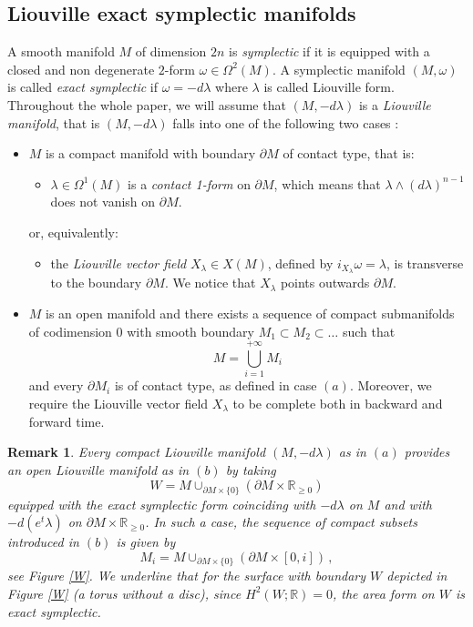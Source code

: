 \documentclass{article}
\newcommand{\1}{\mathbbm{1}}
\newcommand{\numberset}{\mathbb}
\newcommand{\R}{\numberset{R}}
\newtheorem{rem}[thm]{Remark}
\theoremstyle{remark}
\begin{document}
\subsection{Liouville exact symplectic manifolds}
A smooth manifold $M$ of dimension $2n$ is \textit{symplectic} if it is equipped with a closed and non degenerate $2$-form $\omega \in \Omega^2(M)$. A symplectic manifold $(M,\omega)$ is called \textit{exact symplectic} if $\omega = -d\lambda$ where $\lambda$ is called Liouville form. \\
Throughout the whole paper, we will assume that $(M,-d\lambda)$ is a \textit{Liouville manifold}, that is $(M,-d\lambda)$ falls into one of the following two cases : 

\begin{itemize}
\item[$(a)$] $M$ is a compact manifold with boundary $\partial M$ of contact type, that is:
\begin{itemize}
\item[$(a_1)$] $\lambda \in \Omega^1(M)$ is a \textit{contact 1-form} on $\partial M$, which means that $\lambda \wedge (d\lambda)^{n-1}$ does not vanish on $\partial M$.
\end{itemize}
or, equivalently:
\begin{itemize}
\item[$(a_2)$] the \textit{Liouville vector field} $X_\lambda \in X(M)$, defined by $i_{X_\lambda}\omega = \lambda$, is transverse to the boundary $\partial M$. We notice that $X_{\lambda}$ points outwards $\partial M$.
\end{itemize}
\item[$(b)$] $M$ is an open manifold and there exists a sequence of compact submanifolds of codimension 0 with smooth boundary $M_1 \subset M_2 \subset \ldots$ such that
$$M = \bigcup_{i = 1}^{+\infty} M_i$$ 
and every $\partial M_i$ is of contact type, as defined in case $(a)$. Moreover, we require the Liouville vector field $X_\lambda$ to be complete both in backward and forward time. 
\end{itemize}
\begin{rem}
\textnormal{Every compact Liouville manifold $(M,-d\lambda)$ as in $(a)$ provides an open Liouville manifold as in $(b)$ by taking
$$W = M \cup_{\partial M \times \{0\}} (\partial M \times \mathbb{R}_{\geq 0})$$
equipped with the exact symplectic form coinciding with $-d\lambda$ on $M$ and with $-d(e^t\lambda)$ on $\partial M \times \mathbb{R}_{\geq 0}$. In such a case, the sequence of compact subsets introduced in $(b)$ is given by
$$M_i = M \cup_{\partial M \times \{0\}}  (\partial M \times [0,i])\, ,$$
see Figure \ref{W}. We underline that for the surface with boundary $W$ depicted in Figure \ref{W} (a torus without a disc), since $H^2(W; \R)=0$, the area form on $W$ is exact symplectic.}
\end{rem}
\end{document}
